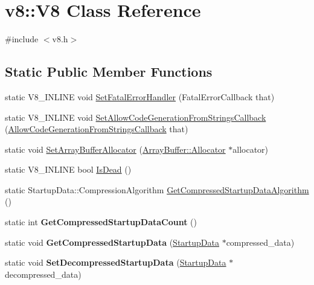 \hypertarget{classv8_1_1V8}{}\section{v8\+:\+:V8 Class Reference}
\label{classv8_1_1V8}


{\ttfamily \#include $<$v8.\+h$>$}

\subsection*{Static Public Member Functions}
\begin{DoxyCompactItemize}
\item 
static V8\+\_\+\+I\+N\+L\+I\+N\+E void \hyperlink{classv8_1_1V8_a290bf883bb4bf8f312089a23a628c067}{Set\+Fatal\+Error\+Handler} (Fatal\+Error\+Callback that)
\item 
static V8\+\_\+\+I\+N\+L\+I\+N\+E void \hyperlink{classv8_1_1V8_a699f7f6cd694d83ebf3cf28b0137b811}{Set\+Allow\+Code\+Generation\+From\+Strings\+Callback} (\hyperlink{namespacev8_a521d909ec201742a1cb35d50a8e2a3c2}{Allow\+Code\+Generation\+From\+Strings\+Callback} that)
\item 
static void \hyperlink{classv8_1_1V8_abc40950a39f8cb6946dc8a1ad41eea84}{Set\+Array\+Buffer\+Allocator} (\hyperlink{classv8_1_1ArrayBuffer_1_1Allocator}{Array\+Buffer\+::\+Allocator} $\ast$allocator)
\item 
static V8\+\_\+\+I\+N\+L\+I\+N\+E bool \hyperlink{classv8_1_1V8_ae5af79b24fc62e987e08c43ee148424d}{Is\+Dead} ()
\item 
static Startup\+Data\+::\+Compression\+Algorithm \hyperlink{classv8_1_1V8_a6d1b72d0cecdc64d0a0b8e784025b625}{Get\+Compressed\+Startup\+Data\+Algorithm} ()
\item 
\hypertarget{classv8_1_1V8_ab598cfc79ebbc85fdeb2171b84ce53e6}{}static int {\bfseries Get\+Compressed\+Startup\+Data\+Count} ()\label{classv8_1_1V8_ab598cfc79ebbc85fdeb2171b84ce53e6}

\item 
\hypertarget{classv8_1_1V8_a736d6ddfdbbd72ca5838f931002334df}{}static void {\bfseries Get\+Compressed\+Startup\+Data} (\hyperlink{classv8_1_1StartupData}{Startup\+Data} $\ast$compressed\+\_\+data)\label{classv8_1_1V8_a736d6ddfdbbd72ca5838f931002334df}

\item 
\hypertarget{classv8_1_1V8_a46d5618689f239b70425b8d7917cebf5}{}static void {\bfseries Set\+Decompressed\+Startup\+Data} (\hyperlink{classv8_1_1StartupData}{Startup\+Data} $\ast$decompressed\+\_\+data)\label{classv8_1_1V8_a46d5618689f239b70425b8d7917cebf5}


\end{DoxyCompactItemize}
